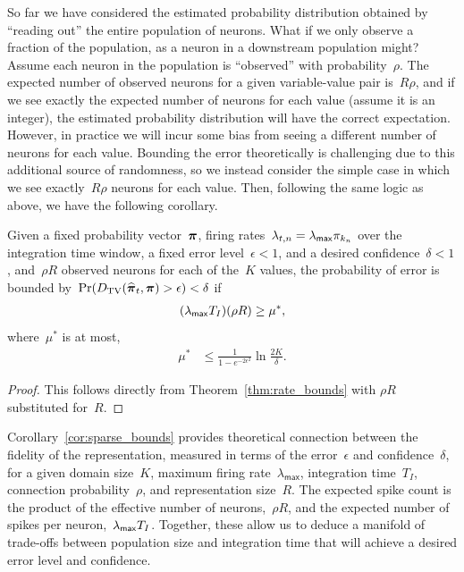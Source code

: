 
So far we have considered the estimated probability distribution
obtained by ``reading out'' the entire population of neurons. What if
we only observe a fraction of the population, as a neuron in a
downstream population might? Assume each neuron in the population is 
``observed'' with probability~$\rho$. The expected number of observed 
neurons for a given variable-value pair is~$R\rho$, and if we see 
exactly the expected number of neurons 
for each value (assume it is an integer), the estimated 
probability distribution will have the correct expectation. However, 
in practice we will incur some bias from seeing a different number of 
neurons for each value. Bounding the error theoretically is challenging 
due to this additional source of randomness, so we instead consider 
the simple case in which we see exactly~$R \rho$ neurons for each value.
Then, following the same logic as above, we have the following 
corollary.

\begin{corollary}
  \label{cor:sparse_bounds}
  Given a fixed probability vector~$\boldsymbol{\pi}$, firing
  rates~$\lambda_{t,n} = \lambda_{\mathsf{max}} \pi_{k_n}$ over the
  integration time window, a fixed error level~$\epsilon < 1$, and a
  desired confidence~$\delta < 1$, and~$\rho R$ observed neurons for
  each of the~$K$ values, the probability of error is bounded
  by~$\Pr({D_{\mathrm{TV}}}(\widehat{\boldsymbol{\pi}}_t, \boldsymbol{\pi}) > \epsilon) < \delta$ if
  \begin{align*}
    (\lambda_{\mathsf{max}} T_I) (\rho R) \geq \mu^*,
  \end{align*} 
  where~$\mu^*$ is at most,
  \begin{align*}
    \mu^* &\leq \frac{1}{1-e^{-2\epsilon^2}} \ln \frac{2K}{\delta}.  
  \end{align*}
\end{corollary}

\begin{proof}
  This follows directly from Theorem~\ref{thm:rate_bounds} with $\rho R$ substituted for~$R$.
\end{proof}

Corollary~\ref{cor:sparse_bounds} provides theoretical connection
between the fidelity of the representation, measured in terms of the
error~$\epsilon$ and confidence~$\delta$, for a given domain size~$K$,
maximum firing rate~$\lambda_{\mathsf{max}}$, integration time~$T_I$,
connection probability~$\rho$, and representation size~$R$.  The
expected spike count is the product of the effective number of
neurons,~$\rho R$, and the expected number of spikes per
neuron,~$\lambda_{\mathsf{max}} T_I$.  Together, these allow us to deduce a
manifold of trade-offs between population size and integration time
that will achieve a desired error level and confidence.


